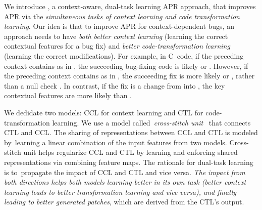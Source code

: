 We introduce {\tool}, a context-aware, dual-task learning APR
approach, that improves APR via the {\em simultaneous tasks of context
  learning and code transformation learning}. Our idea is that to
improve APR for context-dependent bugs, an approach needs to have {\em
  both better context learning} (learning the correct contextual
features for a bug fix) and {\em better code-transformation learning}
(learning the correct modifications). For example, in C~code, if the
preceding context contains  as in , the succeeding bug-fixing code is likely 
 \code{!=}  or  \code{==}
. However, if the preceding context contains 
as in  \code{=} , the
succeeding fix is more likely  \code{!=}
 or  \code{==} , rather than a
null check  \code{!=} . In contrast, if the
fix is a change from  \code{==}  into
 \code{!=} , the key contextual features are
more likely  than .

We dedidate two models: CCL for context learning and CTL for
code-transformation learning. We use a model called~{\em cross-stitch
  unit}~\cite{misra2016cross} that connects CTL and CCL. The sharing
of representations between CCL and CTL is modeled by~learning a linear
combination of the input features from two models. Cross-stitch unit
helps regularize CCL and CTL by learning and enforcing shared
representations via combining feature maps.
The rationale for dual-task learning is to~pro\-pagate the impact of
CCL and CTL and vice versa. {\em The impact from both directions helps both
models learning better in its own task (better context learning leads
to better transformation learning and vice versa), and finally leading
to better generated patches}, which are derived from the CTL's output.


